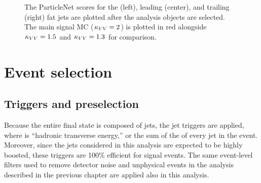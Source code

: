 \begin{figure}[htb]
    \centering
    \qquad
    \qquad
    \caption{
        The ParticleNet scores for the \Htobb (left), leading \Vtoqq (center), and trailing \Vtoqq (right) fat jets are plotted after the analysis objects are selected. 
        The main signal MC ($\kappa_{VV} = 2$) is plotted in red alongside $\kappa_{VV} = 1.5$ and $\kappa_{VV} = 1.3$ for comparison. 
    }
    \label{fig:vbsvvh_dataMC_fatjet_scores}
\end{figure}

\section{Event selection}

\subsection{Triggers and preselection}
Because the entire final state is composed of jets, the jet \HT triggers are applied, where \HT is ``hadronic transverse energy,'' or the sum of the \pt of every jet in the event. 
Moreover, since the jets considered in this analysis are expected to be highly boosted, these triggers are 100\% efficient for signal events. 
The same event-level filters used to remove detector noise and unphysical events in the analysis described in the previous chapter are applied also in this analysis. 

